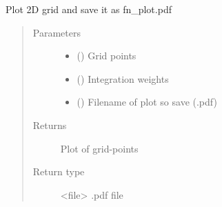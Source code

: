 \documentclass[letterpaper,10pt,english,openany,oneside]{sphinxmanual}
\begin{document}

\begin{fulllineitems}
\label{\detokenize{pygpc:pygpc.Visualization.plot_2d_grid}}
Plot 2D grid and save it as fn\_plot.pdf
\begin{quote}\begin{description}
\item[{Parameters}] \leavevmode\begin{itemize}
\item {} 
 (\sphinxstyleliteralemphasis{\sphinxupquote{ {[}}}\sphinxstyleliteralemphasis{\sphinxupquote{, }}\sphinxstyleliteralemphasis{\sphinxupquote{{]}}}) \textendash{} Grid points

\item {} 
 (\sphinxstyleliteralemphasis{\sphinxupquote{ {[}}}\sphinxstyleliteralemphasis{\sphinxupquote{{]}}}\sphinxstyleliteralemphasis{\sphinxupquote{, }}\sphinxstyleliteralemphasis{\sphinxupquote{, }}) \textendash{} Integration weights

\item {} 
 () \textendash{} Filename of plot so save (.pdf)

\end{itemize}

\item[{Returns}] \leavevmode
Plot of grid-points

\item[{Return type}] \leavevmode
\textless{}file\textgreater{} .pdf file

\end{description}\end{quote}

\end{fulllineitems}
\end{document}
